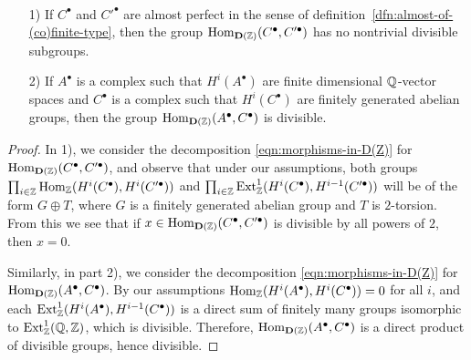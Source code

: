 \documentclass{article}
\numberwithin{equation}{section}
\begin{document}
\begin{appendices}
\begin{lemma}
  \label{lemma:morphisms-inDAb-not-divisible}
  ~

  \begin{enumerate}
  \item[1)] If $C^\bullet$ and $C'^\bullet$ are almost perfect in the sense of
    definition~\ref{dfn:almost-of-(co)finite-type}, then the group
    $\operatorname{Hom}_{\mathbf{D} (\mathbb{Z})} (C^\bullet, C'^\bullet)$ has no nontrivial
    divisible subgroups.

  \item[2)] If $A^\bullet$ is a complex such that $H^i (A^\bullet)$ are finite
    dimensional $\mathbb{Q}$-vector spaces and $C^\bullet$ is a complex such that
    $H^i (C^\bullet)$ are finitely generated abelian groups, then the group
    $\operatorname{Hom}_{\mathbf{D} (\mathbb{Z})} (A^\bullet, C^\bullet)$ is divisible.
  \end{enumerate}

  \begin{proof}
    In 1), we consider the decomposition \eqref{eqn:morphisms-in-D(Z)} for
    $\operatorname{Hom}_{\mathbf{D} (\mathbb{Z})} (C^\bullet, C'^\bullet)$, and observe that under
    our assumptions, both groups
    $\prod_{i\in\mathbb{Z}} \operatorname{Hom}_{\mathbb{Z}} (H^i (C^\bullet), H^i (C'^\bullet))$ and
    $\prod_{i\in\mathbb{Z}} \operatorname{Ext}_{\mathbb{Z}}^1 (H^i (C^\bullet), H^{i-1} (C'^\bullet))$ will be of
    the form $G \oplus T$, where $G$ is a finitely generated abelian group and
    $T$ is $2$-torsion. From this we see that if
    $x \in \operatorname{Hom}_{\mathbf{D} (\mathbb{Z})} (C^\bullet, C'^\bullet)$ is divisible by all
    powers of $2$, then $x = 0$.

    Similarly, in part 2), we consider the decomposition
    \eqref{eqn:morphisms-in-D(Z)} for
    $\operatorname{Hom}_{\mathbf{D} (\mathbb{Z})} (A^\bullet, C^\bullet)$. By our assumptions
    $\operatorname{Hom}_{\mathbb{Z}} (H^i (A^\bullet), H^i (C^\bullet)) = 0$ for all $i$, and each
    $\operatorname{Ext}_{\mathbb{Z}}^1 (H^i (A^\bullet), H^{i-1} (C^\bullet))$ is a direct sum of
    finitely many groups isomorphic to $\operatorname{Ext}_{\mathbb{Z}}^1 (\mathbb{Q},\mathbb{Z})$, which is
    divisible. Therefore, $\operatorname{Hom}_{\mathbf{D} (\mathbb{Z})} (A^\bullet, C^\bullet)$ is
    a direct product of divisible groups, hence divisible.
  \end{proof}
\end{lemma}


\end{appendices}
\end{document}
